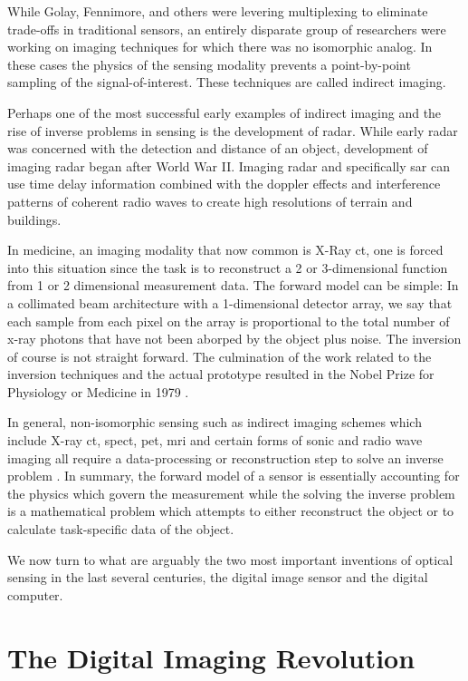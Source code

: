 While Golay, Fennimore, and others were levering multiplexing to eliminate trade-offs in traditional sensors, an entirely disparate group of researchers were working on imaging techniques for which there was no isomorphic analog. In these cases the physics of the sensing modality prevents a point-by-point sampling of the signal-of-interest. These techniques are called indirect imaging. 

Perhaps one of the most successful early examples of indirect imaging and the rise of inverse problems in sensing is the development of radar. While early radar was concerned with the detection and distance of an object, development of imaging radar began after World War II. Imaging radar and specifically \gls{sar} can use time delay information combined with the doppler effects and interference patterns of coherent radio waves to create high resolutions of terrain and buildings. 

In medicine, an imaging modality that now common is X-Ray \gls{ct}, one is forced into this situation since the task is to reconstruct a 2 or 3-dimensional function from 1 or 2 dimensional measurement data. The forward model can be simple: In a collimated beam architecture with a 1-dimensional detector array, we say that each sample from each pixel on the array is proportional to the total number of x-ray photons that have not been aborped by the object \cite{radon20051} plus noise. The inversion of course is not straight forward. The culmination of the work related to the inversion techniques and the actual prototype resulted in the Nobel Prize for Physiology or Medicine in 1979 \cite{nobelprize1979medicine}. 

In general, non-isomorphic sensing such as indirect imaging schemes which include X-ray \gls{ct}, \gls{spect}, \gls{pet}, \gls{mri} and certain forms of sonic and radio wave imaging all require a data-processing or reconstruction step to solve an inverse problem \cite{barrett2013foundations}. In summary, the forward model of a sensor is essentially accounting for the physics which govern the measurement while the solving the inverse problem is a mathematical problem which attempts to either reconstruct the object or to calculate task-specific data of the object. 

We now turn to what are arguably the two most important inventions of optical sensing in the last several centuries, the digital image sensor and the digital computer. 

\section{The Digital Imaging Revolution}

